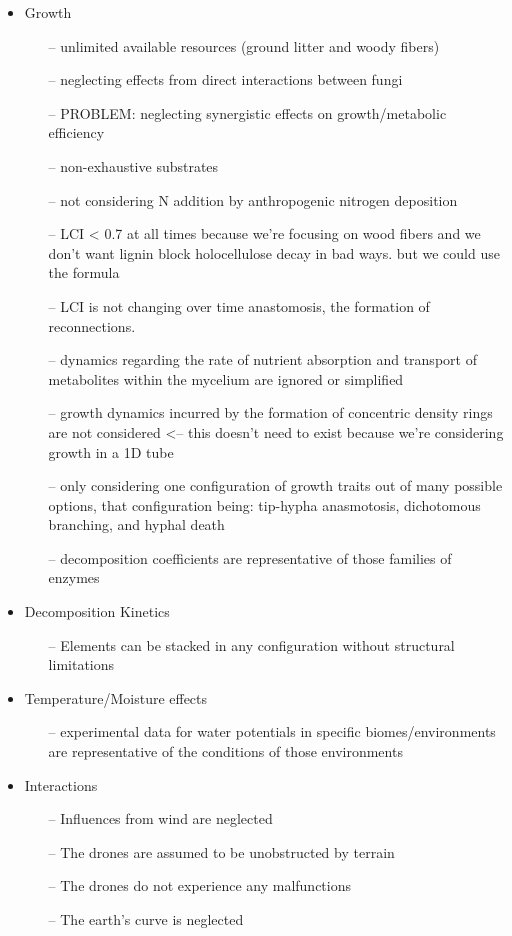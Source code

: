 \documentclass[12pt]{article}
\begin{document}
\begin{multicols}{2}
\begin{itemize}
	\item Growth
	\begin{itemize}
		\item[--] unlimited available resources (ground litter and woody fibers)
		\item[--] neglecting effects from direct interactions between fungi
		\item[--] PROBLEM: neglecting synergistic effects on growth/metabolic efficiency
		\item[--] non-exhaustive substrates
		\item[--] not considering N addition by anthropogenic nitrogen deposition
		\item[--] LCI < 0.7 at all times because we're focusing on wood fibers and we don't want lignin block holocellulose decay in bad ways. but we could use the formula
		\item[--] LCI is not changing over time anastomosis, the formation of reconnections. 
		\item[--] dynamics regarding the rate of nutrient absorption and transport of metabolites within the
		mycelium are ignored or simplified
		\item[--] growth dynamics incurred by the formation of concentric density rings are not considered <-- this doesn't need to exist because we're considering growth in a 1D tube
		\item[--] only considering one configuration of growth traits out of many possible options, that configuration being: tip-hypha anasmotosis, dichotomous branching, and hyphal death
		\item[--] decomposition coefficients are representative of those families of enzymes
	\end{itemize}
	\item Decomposition Kinetics
	\begin{itemize}
		\item[--] Elements can be stacked in any configuration without structural limitations
	\end{itemize}
	\item Temperature/Moisture effects
	\begin{itemize}
		\item[--] experimental data for water potentials in specific biomes/environments are representative of the conditions of those environments 
	\end{itemize}
	\item Interactions
	\begin{itemize}
		\item[--] Influences from wind are neglected
		\item[--] The drones are assumed to be unobstructed by terrain
		\item[--] The drones do not experience any malfunctions
		\item[--] The earth’s curve is neglected
	\end{itemize}
\end{itemize}


\end{multicols}
\end{document}
